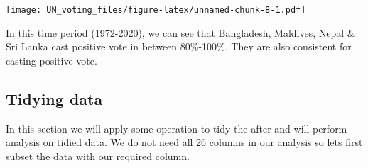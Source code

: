 \documentclass[
]{article}
\newenvironment{Shaded}{\begin{snugshade}}{\end{snugshade}}
\newcommand{\DataTypeTok}[1]{\textcolor[rgb]{0.13,0.29,0.53}{#1}}
\newcommand{\DecValTok}[1]{\textcolor[rgb]{0.00,0.00,0.81}{#1}}
\newcommand{\KeywordTok}[1]{\textcolor[rgb]{0.13,0.29,0.53}{\textbf{#1}}}
\newcommand{\NormalTok}[1]{#1}
\newcommand{\OperatorTok}[1]{\textcolor[rgb]{0.81,0.36,0.00}{\textbf{#1}}}
\newcommand{\StringTok}[1]{\textcolor[rgb]{0.31,0.60,0.02}{#1}}
\begin{document}
\begin{Shaded}
\end{Shaded}

\texttt{[image: UN\_voting\_files/figure-latex/unnamed-chunk-8-1.pdf]}

In this time period (1972-2020), we can see that Bangladesh, Maldives,
Nepal \& Sri Lanka cast positive vote in between 80\%-100\%. They are
also consistent for casting positive vote.

\hypertarget{tidying-data}{%
\subsection{Tidying data}\label{tidying-data}}

In this section we will apply some operation to tidy the after and will
perform analysis on tidied data. We do not need all 26 columns in our
analysis so lets first subset the data with our required column.

\begin{Shaded}
\end{Shaded}
\end{document}
